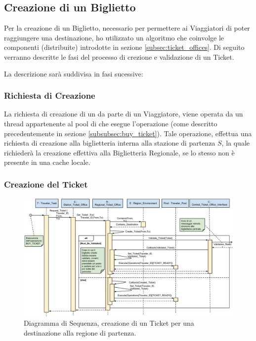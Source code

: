 \newpage
\subsection{Creazione di un Biglietto}

Per la creazione di un Biglietto, necessario per permettere ai Viaggiatori di poter raggiungere una destinazione, ho utilizzato un algoritmo che coinvolge le componenti (distribuite) introdotte in sezione \ref{subsec:ticket_offices}.
Di seguito verranno descritte le fasi del processo di crezione e validazione di un Ticket.


La descrizione sarà suddivisa in fasi sucessive:

	\subsubsection {Richiesta di Creazione}\label{subsubsec:ticket_creation_request}
	
	La richiesta di creazione di un  da parte di un Viaggiatore, viene operata da un thread appartenente al pool di  che esegue l'operazione  (come descritto precedentemente in sezione \ref{subsubsec:buy_ticket}). Tale operazione, effettua una richiesta di creazione alla biglietteria interna alla stazione di partenza $S$, la quale richiederà la creazione effettiva alla Biglietteria Regionale, se lo stesso  non è presente in una cache locale.  
	
	\subsubsection {Creazione del Ticket} \label{subsubsec:ticket_creation}
	
	\begin{figure}[htbp]
		\includegraphics[trim = 65mm 0mm 0mm 0mm,scale=0.48]{imgs/Buy_Ticket_Sequence_Diagram.pdf}
		\caption{\footnotesize{Diagramma di Sequenza, creazione di un Ticket per una destinazione  alla regione di partenza.}}
		\label{fig:local_ticket_creation_diagram}
	\end{figure}
	

